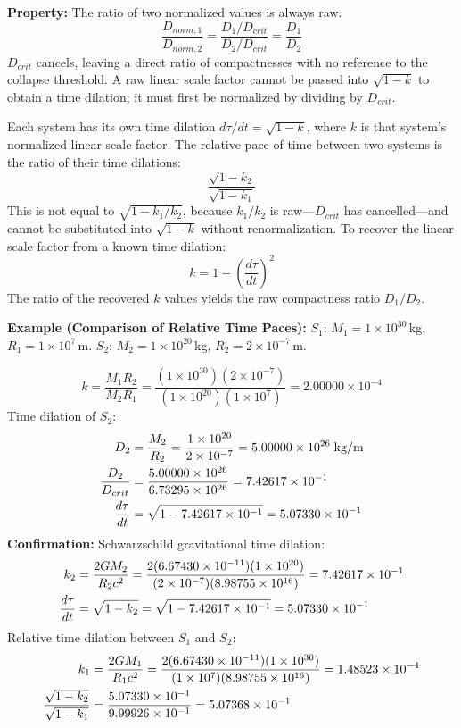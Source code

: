 \documentclass[twoside,twocolumn,9pt]{article}
\begin{document}
\textbf{Property:} The ratio of two normalized values is always raw.
\[
\frac{D_{norm,1}}{D_{norm,2}} = \frac{D_1/D_{crit}}{D_2/D_{crit}} = \frac{D_1}{D_2}
\]
$D_{crit}$ cancels, leaving a direct ratio of compactnesses with no reference to the collapse threshold. A raw linear scale factor cannot be passed into $\sqrt{1-k}$ to obtain a time dilation; it must first be normalized by dividing by $D_{crit}$.

Each system has its own time dilation $d\tau/dt = \sqrt{1 - k}$, where $k$ is that system's normalized linear scale factor. The relative pace of time between two systems is the ratio of their time dilations:
\[
\frac{\sqrt{1 - k_2}}{\sqrt{1 - k_1}}
\]
This is not equal to $\sqrt{1 - k_1/k_2}$, because $k_1/k_2$ is raw---$D_{crit}$ has cancelled---and cannot be substituted into $\sqrt{1-k}$ without renormalization. To recover the linear scale factor from a known time dilation:
\[
k = 1 - \left(\frac{d\tau}{dt}\right)^2
\]
The ratio of the recovered $k$ values yields the raw compactness ratio $D_1/D_2$.

\begin{mdframed}
\textbf{Example (Comparison of Relative Time Paces):} $S_1$: $M_1 = 1 \times 10^{30}$\,kg, $R_1 = 1 \times 10^{7}$\,m. $S_2$: $M_2 = 1 \times 10^{20}$\,kg, $R_2 = 2 \times 10^{-7}$\,m.

\[
k = \frac{M_1 R_2}{M_2 R_1} = \frac{(1 \times 10^{30})(2 \times 10^{-7})}{(1 \times 10^{20})(1 \times 10^{7})} = 2.00000 \times 10^{-4}
\]
Time dilation of $S_2$:
\begin{align}
D_2 &= \frac{M_2}{R_2} = \frac{1 \times 10^{20}}{2 \times 10^{-7}} = 5.00000 \times 10^{26}\;\text{kg/m} \notag \\
\frac{D_2}{D_{crit}} &= \frac{5.00000 \times 10^{26}}{6.73295 \times 10^{26}} = 7.42617 \times 10^{-1} \notag \\
\frac{d\tau}{dt} &= \sqrt{1 - 7.42617 \times 10^{-1}} = 5.07330 \times 10^{-1} \notag
\end{align}
\textbf{Confirmation:} Schwarzschild gravitational time dilation:
\begin{align}
k_2 &= \frac{2GM_2}{R_2 c^2}
= \frac{2(6.67430 \times 10^{-11})(1 \times 10^{20})}{(2 \times 10^{-7})(8.98755 \times 10^{16})}
= 7.42617 \times 10^{-1} \notag \\
\frac{d\tau}{dt} &= \sqrt{1 - k_2} = \sqrt{1 - 7.42617 \times 10^{-1}} = 5.07330 \times 10^{-1} \notag
\end{align}
Relative time dilation between $S_1$ and $S_2$:
\begin{align}
k_1 &= \frac{2GM_1}{R_1 c^2}
= \frac{2(6.67430 \times 10^{-11})(1 \times 10^{30})}{(1 \times 10^{7})(8.98755 \times 10^{16})}
= 1.48523 \times 10^{-4} \notag \\
\frac{\sqrt{1 - k_2}}{\sqrt{1 - k_1}} &= \frac{5.07330 \times 10^{-1}}{9.99926 \times 10^{-1}}
= 5.07368 \times 10^{-1} \notag
\end{align}
\end{mdframed}
\end{document}
